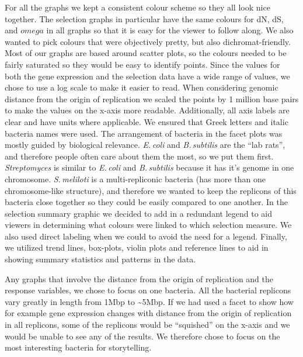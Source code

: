 \documentclass[12pt,]{article}
\begin{document}
For all the graphs we kept a consistent colour scheme so they all look
nice together. The selection graphs in particular have the same colours
for dN, dS, and \(omega\) in all graphs so that it is easy for the
viewer to follow along. We also wanted to pick colours that were
objectively pretty, but also dichromat-friendly. Most of our graphs are
based around scatter plots, so the colours needed to be fairly saturated
so they would be easy to identify points. Since the values for both the
gene expression and the selection data have a wide range of values, we
chose to use a log scale to make it easier to read. When considering
genomic distance from the origin of replication we scaled the points by
1 million base pairs to make the values on the x-axis more readable.
Additionally, all axis labels are clear and have units where applicable.
We ensured that Greek letters and italic bacteria names were used. The
arrangement of bacteria in the facet plots was mostly guided by
biological relevance. \textit{E.\,coli}\xspace and
\textit{B.\,subtilis}\xspace are the ``lab rats'', and therefore people
often care about them the most, so we put them first.
\textit{Streptomyces}\xspace is similar to \textit{E.\,coli}\xspace and
\textit{B.\,subtilis}\xspace because it has it's genome in one
chromosome. \textit{S.\,meliloti}\xspace is a multi-repliconic bacteria
(has more than one chromosome-like structure), and therefore we wanted
to keep the replicons of this bacteria close together so they could be
easily compared to one another. In the selection summary graphic we
decided to add in a redundant legend to aid viewers in determining what
colours were linked to which selection measure. We also used direct
labeling when we could to avoid the need for a legend. Finally, we
utilized trend lines, box-plots, violin plots and reference lines to aid
in showing summary statistics and patterns in the data.

Any graphs that involve the distance from the origin of replication and
the response variables, we chose to focus on one bacteria. All the
bacterial replicons vary greatly in length from 1Mbp to
\textasciitilde5Mbp. If we had used a facet to show how for example gene
expression changes with distance from the origin of replication in all
replicons, some of the replicons would be ``squished'' on the x-axis and
we would be unable to see any of the results. We therefore chose to
focus on the most interesting bacteria for storytelling.
\end{document}
